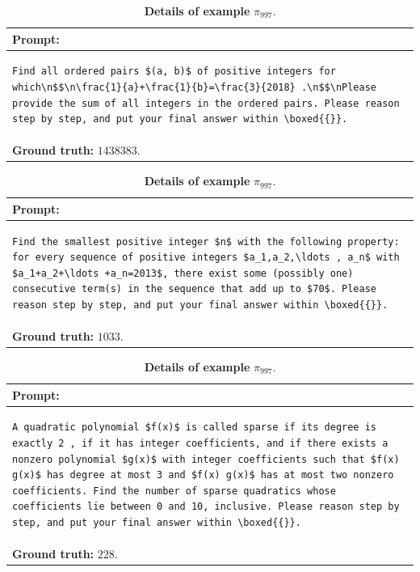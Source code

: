 \begin{table}[!t]
\centering
\caption{\textbf{Details of example} $\pi_{973}$.}
\begin{tabular}{p{}}
\toprule
\textbf{Prompt:} \\
\midrule
\footnotesize
\begin{lstlisting}[breaklines=true, basicstyle=\ttfamily, aboveskip=-1.0em, belowskip=0pt, breakindent=0pt]
Find all ordered pairs $(a, b)$ of positive integers for which\n$$\n\frac{1}{a}+\frac{1}{b}=\frac{3}{2018} .\n$$\nPlease provide the sum of all integers in the ordered pairs. Please reason step by step, and put your final answer within \boxed{{}}.
\end{lstlisting} \\
\midrule
\textbf{Ground truth:} $1438383$. \\
\bottomrule
\end{tabular}

\caption{\textbf{Details of example} $\pi_{987}$.}
\begin{tabular}{p{}}
\toprule
\textbf{Prompt:} \\
\midrule
\footnotesize
\begin{lstlisting}[breaklines=true, basicstyle=\ttfamily, aboveskip=-1.0em, belowskip=0pt, breakindent=0pt]
Find the smallest positive integer $n$ with the following property:  for every sequence of positive integers $a_1,a_2,\ldots , a_n$ with $a_1+a_2+\ldots +a_n=2013$, there exist some (possibly one) consecutive term(s) in the sequence that add up to $70$. Please reason step by step, and put your final answer within \boxed{{}}.
\end{lstlisting} \\
\midrule
\textbf{Ground truth:} $1033$. \\
\bottomrule
\end{tabular}

\caption{\textbf{Details of example} $\pi_{997}$.}
\begin{tabular}{p{}}
\toprule
\textbf{Prompt:} \\
\midrule
\footnotesize
\begin{lstlisting}[breaklines=true, basicstyle=\ttfamily, aboveskip=-1.0em, belowskip=0pt, breakindent=0pt]
A quadratic polynomial $f(x)$ is called sparse if its degree is exactly 2 , if it has integer coefficients, and if there exists a nonzero polynomial $g(x)$ with integer coefficients such that $f(x) g(x)$ has degree at most 3 and $f(x) g(x)$ has at most two nonzero coefficients. Find the number of sparse quadratics whose coefficients lie between 0 and 10, inclusive. Please reason step by step, and put your final answer within \boxed{{}}.
\end{lstlisting} \\
\midrule
\textbf{Ground truth:} $228$. \\
\bottomrule
\end{tabular}
\end{table}


